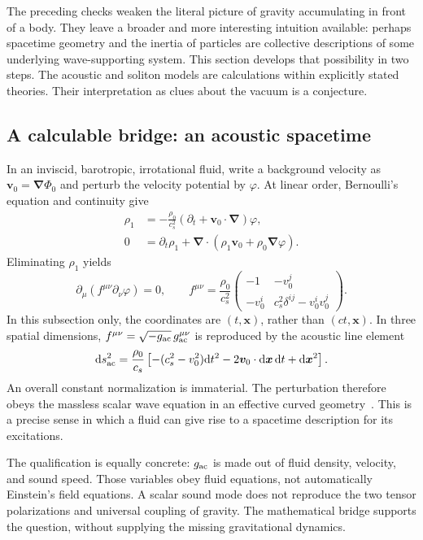 \documentclass[11pt,a4paper]{article}
\numberwithin{equation}{section}
\newcommand{\dd}{\mathrm{d}}
\begin{document}
The preceding checks weaken the literal picture of gravity accumulating in front of a body. They leave a broader and more interesting intuition available: perhaps spacetime geometry and the inertia of particles are collective descriptions of some underlying wave-supporting system. This section develops that possibility in two steps. The acoustic and soliton models are calculations within explicitly stated theories. Their interpretation as clues about the vacuum is a conjecture.

\subsection{A calculable bridge: an acoustic spacetime}

In an inviscid, barotropic, irrotational fluid, write a background velocity as $\bm v_0=\bm\nabla\Phi_0$ and perturb the velocity potential by $\varphi$. At linear order, Bernoulli's equation and continuity give
\begin{align}
 \rho_1&=-\frac{\rho_0}{c_s^2}
 (\partial_t+\bm v_0\cdot\bm\nabla)\varphi,\\
 0&=\partial_t\rho_1+
 \bm\nabla\cdot(\rho_1\bm v_0+\rho_0\bm\nabla\varphi).
\end{align}
Eliminating $\rho_1$ yields
\begin{equation}
 \partial_\mu(f^{\mu\nu}\partial_\nu\varphi)=0,
 \qquad
 f^{\mu\nu}=\frac{\rho_0}{c_s^2}
 \begin{pmatrix}
 -1&-v_0^j\\
 -v_0^i&c_s^2\delta^{ij}-v_0^iv_0^j
 \end{pmatrix}.
 \label{eq:acoustic-f}
\end{equation}
In this subsection only, the coordinates are $(t,\bm x)$, rather than $(ct,\bm x)$. In three spatial dimensions, $f^{\mu\nu}=\sqrt{-g_{\rm ac}}\,g_{\rm ac}^{\mu\nu}$ is reproduced by the acoustic line element
\begin{equation}
 \dd s_{\rm ac}^2=\frac{\rho_0}{c_s}
 \left[-(c_s^2-v_0^2)\dd t^2
 -2\bm v_0\cdot\dd\bm x\,\dd t+\dd\bm x^2\right].
 \label{eq:acoustic-metric}
\end{equation}
An overall constant normalization is immaterial. The perturbation therefore obeys the massless scalar wave equation in an effective curved geometry~\cite{barcelo}. This is a precise sense in which a fluid can give rise to a spacetime description for its excitations.

The qualification is equally concrete: $g_{\rm ac}$ is made out of fluid density, velocity, and sound speed. Those variables obey fluid equations, not automatically Einstein's field equations. A scalar sound mode does not reproduce the two tensor polarizations and universal coupling of gravity. The mathematical bridge supports the question, without supplying the missing gravitational dynamics.
\end{document}
